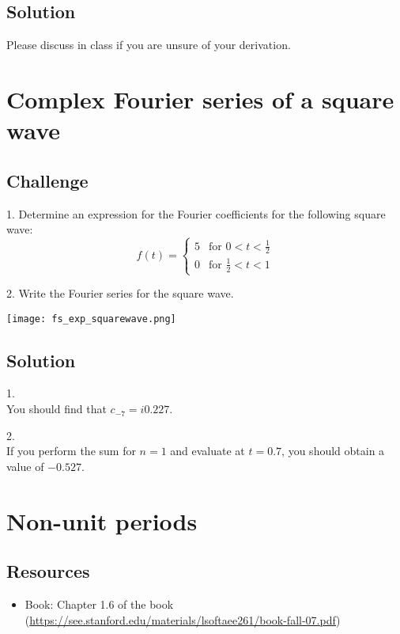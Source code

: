 \subsection*{Solution}
Please discuss in class if you are unsure of your derivation.




\newpage
\section{Complex Fourier series of a square wave}

\subsection*{Challenge}
1. Determine an expression for the Fourier coefficients for the following square wave:
\begin{equation}
   f(t) =
   \begin{cases}
       5 & \text{for } 0 < t < \frac{1}{2} \\
       0 & \text{for } \frac{1}{2} < t < 1
   \end{cases} 
\end{equation}

2. Write the Fourier series for the square wave.

\texttt{[image: fs\_exp\_squarewave.png]}

\subsection*{Solution}
1.\\
You should find that $c_{-7} = i 0.227$.

2.\\
If you perform the sum for $n=1$ and evaluate at $t=0.7$, you should obtain a value of $-0.527$.




\newpage
\section{Non-unit periods}

\subsection*{Resources}
\begin{itemize}
    \item Book: Chapter 1.6 of the book (\url{https://see.stanford.edu/materials/lsoftaee261/book-fall-07.pdf})
\end{itemize}

